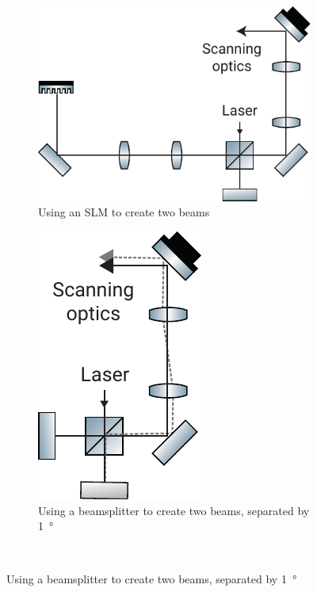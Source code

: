 \begin{figure}
\centering
    \begin{subfigure}[t]{0.6\textwidth}
        \centering
         \includegraphics{dual_beam_layout/slm}
         \caption{Using an \gls{SLM} to create two beams}\label{fig:dual_beam_layout/slm}
    \end{subfigure}
    \hspace{\fill}
    \begin{subfigure}[t]{0.3\textwidth}
        \centering
         \includegraphics{dual_beam_layout/beamsplitter}
         \caption{Using a beamsplitter to create two beams, separated by \SI{1}{\degree}}\label{fig:dual_beam_layout/beamsplitter} %
    \end{subfigure}\\

\end{figure}
